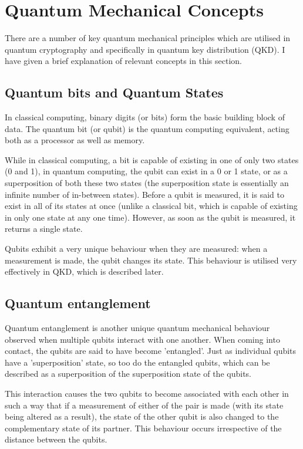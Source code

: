 \documentclass[runningheads,a4paper]{llncs}
\begin{document}
\section{Quantum Mechanical Concepts}

There are a number of key quantum mechanical principles which are utilised in quantum cryptography and specifically in quantum key distribution (QKD). I have given a brief explanation of relevant concepts in this section.

\subsection{Quantum bits and Quantum States}

In classical computing, binary digits (or bits) form the basic building block of data. The quantum bit (or qubit) is the quantum computing equivalent, acting both as a processor as well as memory. 

While in classical computing, a bit is capable of existing in one of only two states (0 and 1), in quantum computing, the qubit can exist in a 0 or 1 state, or as a superposition of both these two states (the superposition state is essentially an infinite number of in-between states). Before a qubit is measured, it is said to exist in all of its states at once (unlike a classical bit, which is capable of existing in only one state at any one time). However, as soon as the qubit is measured, it returns a single state.

Qubits exhibit a very unique behaviour when they are measured: when a measurement is made, the qubit changes its state. This behaviour is utilised very effectively in QKD, which is described later.

\subsection{Quantum entanglement}

Quantum entanglement is another unique quantum mechanical behaviour observed when multiple qubits interact with one another. When coming into contact, the qubits are said to have become 'entangled'. Just as individual qubits have a 'superposition' state, so too do the entangled qubits, which can be described as a superposition of the superposition state of the qubits.

This interaction causes the two qubits to become associated with each other in such a way that if a measurement of either of the pair is made (with its state being altered as a result), the state of the other qubit is also changed to the complementary state of its partner. This behaviour occurs irrespective of the distance between the qubits.
\end{document}
